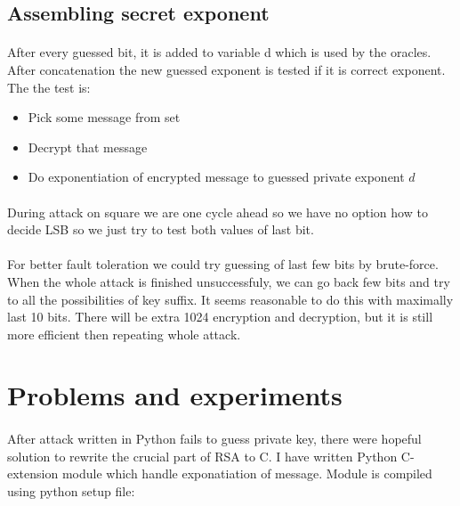 \documentclass[thesis=B,english]{FITthesis}[2012/10/20]
\begin{document}
{{\subsection{Assembling secret exponent}
\paragraph*{}{
After every guessed bit, it is added to variable d which is used by the oracles. After concatenation the new guessed exponent is tested if it is correct exponent.
The the test is:}
\begin{itemize}
 \item Pick some message from set
 \item Decrypt that message
 \item Do exponentiation of encrypted message to guessed private exponent \(d\)
\end{itemize}

\paragraph*{}{
During attack on square we are one cycle ahead so we have no option how to decide LSB so we just try to test both values of last bit.
}

\paragraph*{}
{For better fault toleration we could try guessing of last few bits by brute-force. When the whole attack is finished unsuccessfuly, we can go back few bits and try to all the possibilities of key suffix. It seems reasonable to do this with maximally last 10 bits. There will be extra 1024 encryption and decryption, but it is still more efficient then repeating whole attack.
}
\section{Problems and experiments}
\paragraph*{}{
After attack written in Python fails to guess private key, there were hopeful solution to rewrite the crucial part of RSA to C. I have written Python C-extension module which handle exponatiation of message. Module is compiled using python setup file:
}
}}
\end{document}
